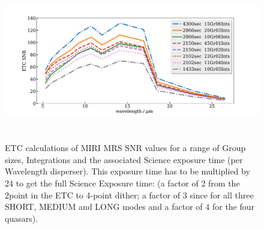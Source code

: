 \begin{figure}
  \begin{center}
    \includegraphics[height=7.0cm,width=16.5cm]{../ETC_calcs/SNR_vs_wavelength_comparisons_full.pdf}
    \end{center}
    \vspace{-20pt}
    \caption{ETC calculations of MIRI MRS SNR values for a range of Group
      sizes, Integrations and the associated Science exposure time (per
      Wavelength disperser).  This exposure time 
      has to be multiplied by 24 to get the full Science Exposure time:   
      (a factor of 2 from the 2point in the ETC to 4-point dither; 
      a factor of 3 since for all three SHORT, MEDIUM and LONG modes and 
      a factor of 4 for the four quasars). 
 }
    \label{fig:SNR_vs_wavelength}
  \end{figure}
  
